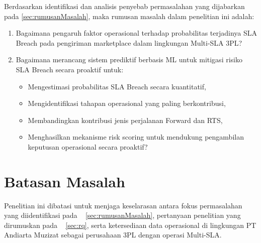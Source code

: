 Berdasarkan identifikasi dan analisis penyebab permasalahan yang dijabarkan pada \ref{sec:rumusanMasalah}, maka rumusan masalah dalam penelitian ini adalah:
\begin{enumerate}
    \item Bagaimana pengaruh faktor operasional terhadap probabilitas terjadinya SLA Breach pada pengiriman marketplace dalam lingkungan Multi-SLA 3PL?
    \item Bagaimana merancang sistem prediktif berbasis ML untuk mitigasi risiko SLA Breach secara proaktif untuk:
    \begin{itemize}
        \item Mengestimasi probabilitas SLA Breach secara kuantitatif,
        \item Mengidentifikasi tahapan operasional yang paling berkontribusi,
        \item Membandingkan kontribusi jenis perjalanan Forward dan RTS,
        \item Menghasilkan mekanisme risk scoring untuk mendukung pengambilan keputusan operasional secara proaktif?
    \end{itemize}
\end{enumerate}


\section{Batasan Masalah}
\label{sec:batasanMasalah}
Penelitian ini dibatasi untuk menjaga keselarasan antara fokus permasalahan yang diidentifikasi pada \sect~ \ref{sec:rumusanMasalah}, pertanyaan penelitian yang dirumuskan pada \sect~ \ref{sec:rq}, serta ketersediaan data operasional di lingkungan PT Andiarta Muzizat sebagai perusahaan 3PL dengan operasi Multi-SLA.


